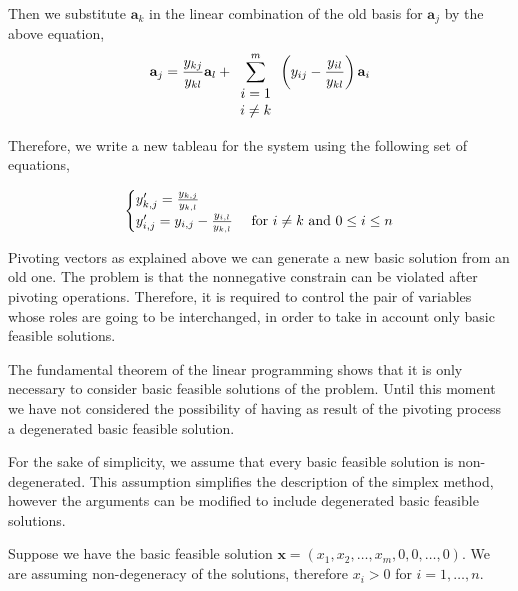 Then we substitute $\mathbf{a}_{k}$ in the linear combination of the old basis for $\mathbf{a}_j$ by the above equation,
\begin{equation*}
	\mathbf{a}_j =\frac{y_{kj}}{y_{kl}}\mathbf{a}_l+\sum_{\begin{array}{c}
			i=1 \\ i\neq k
		\end{array}}^{m}\left( y_{ij}-\frac{y_{il}}{y_{kl}} \right)\mathbf{a}_i
\end{equation*} 

Therefore, we write a new tableau for the system using the following set of equations,

\begin{equation}
	\begin{cases}
	y'_{k,j}= \frac{y_{k,j}}{y_{k,l}} & \\
	y'_{i,j}= y_{i,j}-\frac{y_{i,l}}{y_{k,l}} &  \text{ for }i\neq k \ \mathrm{and} \ 0\leq i\leq n 
	\end{cases}
\end{equation}


Pivoting vectors as explained above we can generate a new basic solution from an old one. The problem is that the nonnegative constrain can be violated after pivoting operations. Therefore, it is required to control the pair of variables whose roles are going to be interchanged, in order to take in account only basic feasible solutions.

The fundamental theorem of the linear programming shows that it is only necessary to consider basic feasible solutions of the problem. Until this moment we have not considered the possibility of having as result of the pivoting process a degenerated basic feasible solution. 

For the sake of simplicity, we assume that every basic feasible solution is non-degenerated. This assumption simplifies the description of the simplex method, however the arguments can be modified to include degenerated basic feasible solutions.

Suppose we have the basic feasible solution $\mathbf{x}=\left(x_1, x_2, \dots, x_m, 0,0, \dots, 0\right)$. We are assuming non-degeneracy of the solutions, therefore $x_i>0$ for $i=1,\dots, n$. 

